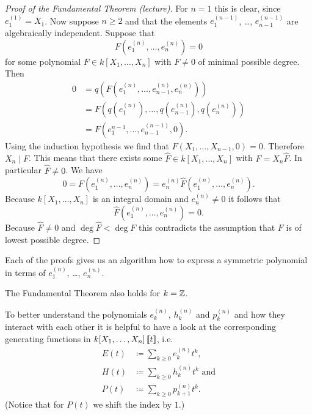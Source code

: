 \begin{proof}[Proof of the Fundamental Theorem (lecture)]
 For $n = 1$ this is clear, since $e^{(1)}_1 = X_1$. Now suppose $n \geq 2$ and that the elements $e^{(n-1)}_1$, \dots, $e^{(n-1)}_{n-1}$ are algebraically independent. Suppose that
 \[
  F\left(e^{(n)}_1, \dotsc, e^{(n)}_n\right) = 0
 \]
 for some polynomial $F \in k[X_1, \dotsc, X_n]$ with $F \neq 0$ of minimal possible degree. Then
 \begin{align*}
  0
  &= q\left(F\left(e^{(n)}_1, \dotsc, e^{(n)}_{n-1} ,e^{(n)}_n\right)\right) \\
  &= F\left( q\left(e^{(n)}_1\right), \dotsc, q\left(e^{(n)}_{n-1}\right), q\left(e^{(n)}_n\right) \right) \\
  &= F\left( e^{n-1}_1, \dotsc, e^{(n-1)}_{n-1}, 0 \right).
 \end{align*}
 Using the induction hypothesis we find that $F(X_1, \dotsc, X_{n-1}, 0) = 0$. Therefore $X_n \mid F$. This means that there exists some $\hat{F} \in k[X_1, \dotsc, X_n]$ with $F = X_n \hat{F}$. In particular $\hat{F} \neq 0$. We have
 \[
  0
  = F\left(e^{(n)}_1, \dotsc, e^{(n)}_n\right)
  = e^{(n)}_n \hat{F}\left(e^{(n)}_1, \dotsc, e^{(n)}_n\right).
 \]
 Because $k[X_1, \dotsc, X_n]$ is an integral domain and $e^{(n)}_n \neq 0$ it follows that
 \[
  \hat{F}\left(e^{(n)}_1, \dotsc, e^{(n)}_n\right) = 0.
 \]
 Because $\hat{F} \neq 0$ and $\deg \hat{F} < \deg F$ this contradicts the assumption that $F$ is of lowest possible degree.
\end{proof}


\begin{rem}
 Each of the proofs gives us an algorithm how to express a symmetric polynomial in terms of $e^{(n)}_1$, \dots, $e^{(n)}_n$.
\end{rem}


\begin{rem}
 The Fundamental Theorem also holds for $k = \mathbb{Z}$.
\end{rem}


To better understand the polynomials $e^{(n)}_k$, $h^{(n)}_k$ and $p^{(n)}_k$ and how they interact with each other it is helpful to have a look at the corresponding generating functions in $k[X_1, \dotsc, X_n]\left[\!\left[t\right]\!\right]$, i.e.
\begin{align*}
 E(t) &\coloneqq \sum_{k \geq 0} e^{(n)}_k t^k, \\
 H(t) &\coloneqq \sum_{k \geq 0} h^{(n)}_k t^k \text{ and} \\
 P(t) &\coloneqq \sum_{k \geq 0} p^{(n)}_{k+1} t^k.
\end{align*}
(Notice that for $P(t)$ we shift the index by $1$.)


